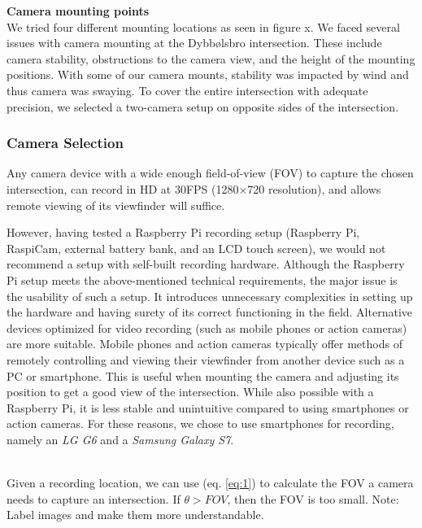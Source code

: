 \textbf{Camera mounting points} \\
We tried four different mounting locations as seen in figure x. 
We faced several issues with camera mounting at the Dybbølsbro intersection.
These include camera stability, obstructions to the camera view, and the height of the mounting positions. 
With some of our camera mounts, stability was impacted by wind and thus camera was swaying. 
To cover the entire intersection with adequate precision, we selected a two-camera setup on opposite 
sides of the intersection.


\subsubsection{Camera Selection}
Any camera device with a wide enough field-of-view (FOV) to capture the chosen intersection, 
can record in HD at 30FPS (1280×720 resolution), and allows remote viewing of its viewfinder will suffice. 

However, having tested a Raspberry Pi recording setup (Raspberry Pi, RaspiCam, external battery bank, 
and an LCD touch screen), we would not recommend a setup with self-built recording hardware.
Although the Raspberry Pi setup meets the above-mentioned technical requirements, the major issue is 
the usability of such a setup. 
It introduces unnecessary complexities in setting up the hardware and having surety of its correct functioning in the field.
Alternative devices optimized for video recording (such as mobile phones or action cameras) are more suitable.
Mobile phones and action cameras typically offer methods of remotely controlling and viewing their viewfinder from 
another device such as a PC or smartphone. 
This is useful when mounting the camera and adjusting its position to get a good view of the intersection. 
While also possible with a Raspberry Pi, it is less stable and unintuitive compared to using smartphones or action cameras.
For these reasons, we chose to use smartphones for recording, namely an \textit{LG G6} and a \textit{Samsung Galaxy S7}.

\ \\

Given a recording location, we can use (eq. \ref{eq:1}) to calculate the FOV a camera needs to capture an intersection.
If $\theta > FOV$, then the FOV is too small.
\color{red}
Note: Label images and make them more understandable.
\color{black}

